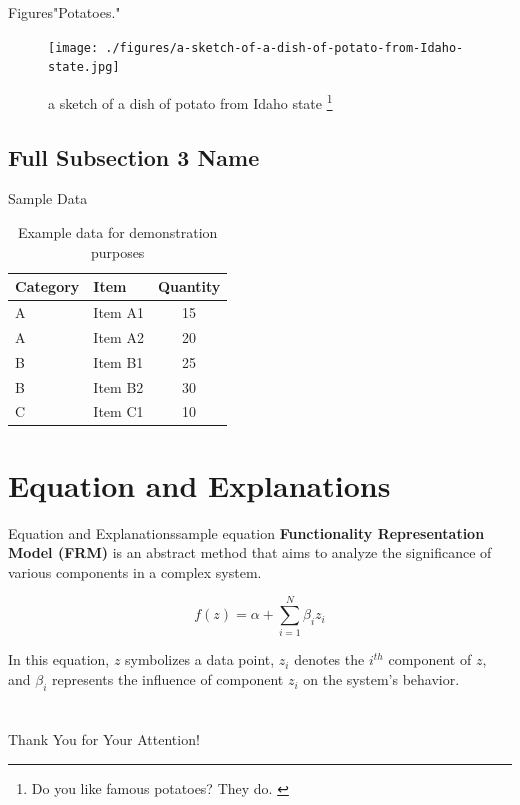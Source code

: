\documentclass[
]{beamer}
\begin{document}
\begin{frame}{Figures}{"Potatoes."}

\begin{figure}
    \texttt{[image: ./figures/a-sketch-of-a-dish-of-potato-from-Idaho-state.jpg]}
      \caption{a sketch of a dish of potato from Idaho state%
        \footnote{%
          Do you like famous potatoes?
          They do.
          \cite{evelyn1984potatoes}
        }%
      }

\end{figure}
\end{frame}


\subsection[Short Subsection 3 Name]{Full Subsection 3 Name}


\begin{frame}{Sample Data}
\begin{table}
  \begin{tabular}{llc}
    Category & Item & Quantity \\ \midrule
    A & Item A1 & 15 \\
    A & Item A2 & 20 \\
    B & Item B1 & 25 \\
    B & Item B2 & 30 \\
    C & Item C1 & 10 \\
  \end{tabular}
  \caption{Example data for demonstration purposes}
\end{table}
\end{frame}


\section[Equation]{Equation and Explanations}

\begin{frame}{Equation and Explanations}{sample equation}
\textbf{Functionality Representation Model (FRM)} is an abstract method that aims to analyze the significance of various components in a complex system.

$$f(z) = \alpha + \sum^{N}_{i=1}\beta_iz_i$$

In this equation, $z$ symbolizes a data point, $z_i$ denotes the $i^{th}$ component of $z$, and $\beta_i$ represents the influence of component $z_i$ on the system's behavior.
    
\end{frame}

\section{\bibname}
\begin{frame}[t, allowframebreaks]{\bibname}
\printbibliography[heading=none]
\end{frame}




\begin{frame}%
\vfill
\centerline{Thank You for Your Attention!}
\vfill\vfill
\end{frame}
%
\end{document}
